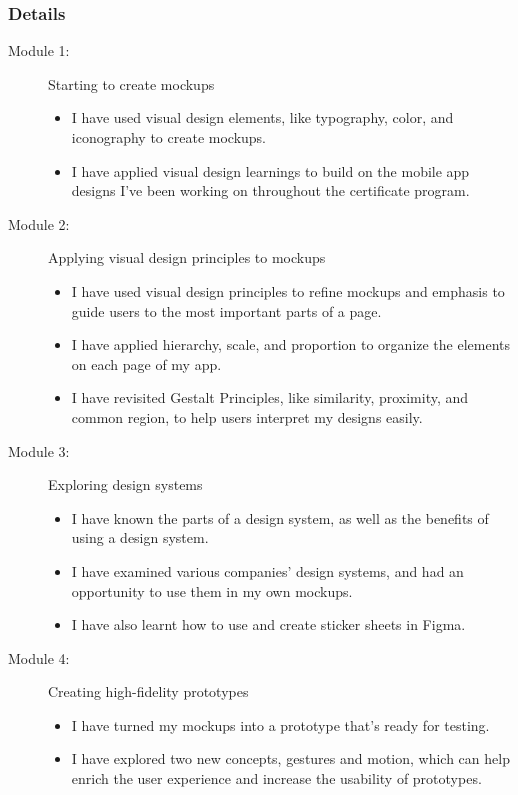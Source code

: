 \subsubsection{Details}
\begin{flushleft}
	\begin{description}
		\item[Module 1:] Starting to create mockups
		      \begin{itemize}
			      \item I have used visual design elements, like typography, color, and iconography to create mockups.
			      \item I have applied visual design learnings to build on the mobile app designs I've been working on throughout the certificate program.
		      \end{itemize}
		\item[Module 2:] Applying visual design principles to mockups
		      \begin{itemize}
			      \item I have used visual design principles to refine mockups and emphasis to guide users to the most important parts of a page.
			      \item I have applied hierarchy, scale, and proportion to organize the elements on each page of my app.
			      \item I have revisited Gestalt Principles, like similarity, proximity, and common region, to help users interpret my designs easily.
		      \end{itemize}
		\item[Module 3:] Exploring design systems
		      \begin{itemize}
			      \item I have known the parts of a design system, as well as the benefits of using a design system.
			      \item I have examined various companies' design systems, and had an opportunity to use them in my own mockups.
			      \item I have also learnt how to use and create sticker sheets in Figma.
		      \end{itemize}
		\item[Module 4:] Creating high-fidelity prototypes
		      \begin{itemize}
			      \item I have turned my mockups into a prototype that's ready for testing.
			      \item I have explored two new concepts, gestures and motion, which can help enrich the user experience and increase the usability of prototypes.

\end{itemize}
\end{description}
\end{flushleft}
